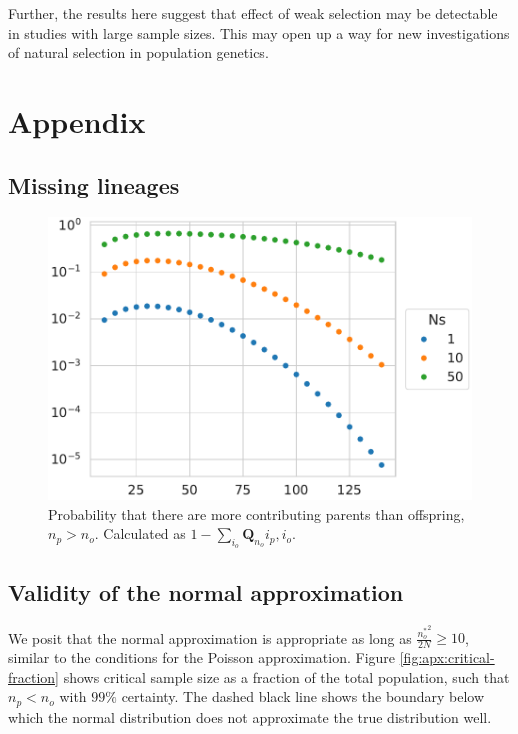 \documentclass[review]{elsarticle}
\newcommand{\sgcomment}[1]{{\color{red}{SG: #1}}}
\begin{document}
Further, the results here suggest that effect of weak selection may be detectable in studies with
large sample sizes. This may open up a way for new investigations of natural selection in population
genetics.



\section{Appendix}

\subsection{Missing lineages}

\begin{figure}
  \centering
  \includegraphics[width=\textwidth]{fig/missing.pdf}
  \caption{Probability that there are more contributing parents than offspring, $n_p > n_o$. \sgcomment{Missing information, such as $N$}
    Calculated as $1-\sum_{i_o} \mathbf{Q}_{n_o}{i_p, i_o}.$}
  \label{fig:apx:missing}
\end{figure}

\subsection{Validity of the normal approximation}

We posit that the normal approximation is appropriate as long as $\frac{{n_o^*}^2}{2N} \ge 10$,
similar to the conditions for the Poisson approximation. Figure \ref{fig:apx:critical-fraction}
shows critical sample size as a fraction of the total population, such that $n_p < n_o$ with $99\%$
certainty. The dashed black line shows the boundary below which the normal distribution does not
approximate the true distribution well.
\end{document}
